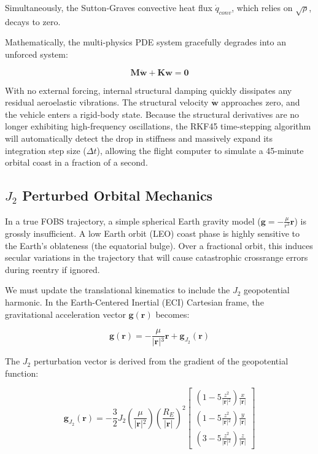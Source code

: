 \documentclass[11pt,a4paper]{article}
\theoremstyle{definition}
\numberwithin{equation}{section}
\begin{document}
Simultaneously, the Sutton-Graves convective heat flux $\dot{q}_{conv}$, which relies on $\sqrt{\rho}$, decays to zero.

Mathematically, the multi-physics PDE system gracefully degrades into an unforced system:

$$\mathbf{M} \mathbf{\ddot{w}} + \mathbf{K} \mathbf{w} = \mathbf{0}$$

With no external forcing, internal structural damping quickly dissipates any residual aeroelastic vibrations. The structural velocity $\mathbf{\dot{w}}$ approaches zero, and the vehicle enters a rigid-body state. Because the structural derivatives are no longer exhibiting high-frequency oscillations, the RKF45 time-stepping algorithm will automatically detect the drop in stiffness and massively expand its integration step size ($\Delta t$), allowing the flight computer to simulate a 45-minute orbital coast in a fraction of a second.

\subsection{$J_2$ Perturbed Orbital Mechanics}
In a true FOBS trajectory, a simple spherical Earth gravity model ($\mathbf{g} = -\frac{\mu}{r^3} \mathbf{r}$) is grossly insufficient. A low Earth orbit (LEO) coast phase is highly sensitive to the Earth's oblateness (the equatorial bulge). Over a fractional orbit, this induces secular variations in the trajectory that will cause catastrophic crossrange errors during reentry if ignored.

We must update the translational kinematics to include the $J_2$ geopotential harmonic. In the Earth-Centered Inertial (ECI) Cartesian frame, the gravitational acceleration vector $\mathbf{g}(\mathbf{r})$ becomes:

$$\mathbf{g}(\mathbf{r}) = -\frac{\mu}{\vert{}\mathbf{r}\vert{}^3} \mathbf{r} + \mathbf{g}_{J_2}(\mathbf{r})$$

The $J_2$ perturbation vector is derived from the gradient of the geopotential function:

$$\mathbf{g}_{J_2}(\mathbf{r}) = -\frac{3}{2} J_2 \left(\frac{\mu}{\vert{}\mathbf{r}\vert{}^2}\right) \left(\frac{R_E}{\vert{}\mathbf{r}\vert{}}\right)^2 \begin{bmatrix} \left(1 - 5\frac{z^2}{\vert{}\mathbf{r}\vert{}^2}\right) \frac{x}{\vert{}\mathbf{r}\vert{}} \\ \left(1 - 5\frac{z^2}{\vert{}\mathbf{r}\vert{}^2}\right) \frac{y}{\vert{}\mathbf{r}\vert{}} \\ \left(3 - 5\frac{z^2}{\vert{}\mathbf{r}\vert{}^2}\right) \frac{z}{\vert{}\mathbf{r}\vert{}} \end{bmatrix}$$
\end{document}
